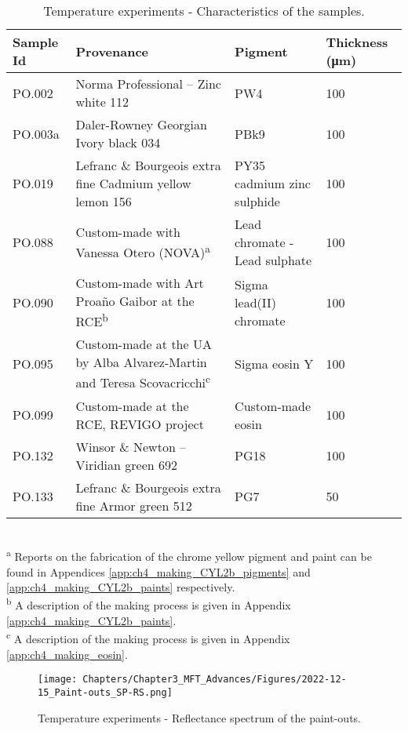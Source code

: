 \begin{table*}
\centering %
\caption[\hspace{0.3cm}Temperature experiments - Characteristics of the samples.]{Temperature experiments - Characteristics of the samples.}
\begin{tabular}{C{1.5cm}C{6.5cm}C{2.5cm}C{1.5cm}}
\toprule[0.4mm]
\textbf{Sample Id} & \textbf{Provenance} & \textbf{Pigment} & \textbf{Thickness (\unit{\um})} \\\midrule
PO.002 & Norma Professional – Zinc white 112 & PW4 & 100 \\
PO.003a & Daler-Rowney Georgian Ivory black 034 & PBk9 & 100 \\
PO.019 & Lefranc \& Bourgeois extra fine Cadmium yellow lemon 156 & PY35 cadmium zinc sulphide & 100 \\
PO.088 & Custom-made with Vanessa Otero (NOVA)\textsuperscript{a} & Lead chromate - Lead sulphate & 100 \\
PO.090 & Custom-made with Art Proa\~{n}o Gaibor at the \gls{RCE}\textsuperscript{b} & Sigma lead(II) chromate & 100 \\
PO.095 & Custom-made at the \acrshort{UA} by Alba Alvarez-Martin and Teresa Scovacricchi\textsuperscript{c} & Sigma eosin Y & 100 \\
PO.099 & Custom-made at the \gls{RCE}, \gls{REVIGO} project \citep[Table 4]{geldof_reconstructing_2018} & Custom-made eosin & 100 \\
PO.132 & Winsor \& Newton – Viridian green 692 & PG18 & 100 \\
PO.133 & Lefranc \& Bourgeois extra fine Armor green 512 & PG7 & 50 \\ \bottomrule[0.4mm]
\end{tabular}
\footnotesize{\\ \textsuperscript{a} Reports on the fabrication of the chrome yellow pigment and paint can be found in Appendices \ref{app:ch4_making_CYL2b_pigments} and \ref{app:ch4_making_CYL2b_paints} respectively. \\ \textsuperscript{b} A description of the making process is given in Appendix \ref{app:ch4_making_CYL2b_paints}. \\ \textsuperscript{c} A description of the making process is given in Appendix \ref{app:ch4_making_eosin}.}
\label{tab:T-exp_info_PO}
\end{table*}


\begin{figure*}
\centering
\texttt{[image: Chapters/Chapter3\_MFT\_Advances/Figures/2022-12-15\_Paint-outs\_SP-RS.png]}
\caption[\hspace{0.3cm}Temperature experiments - Reflectance spectrum of the paint-outs.]{Temperature experiments - Reflectance spectrum of the paint-outs.}
\label{fig:T-exp_PO_RS}
\end{figure*}

